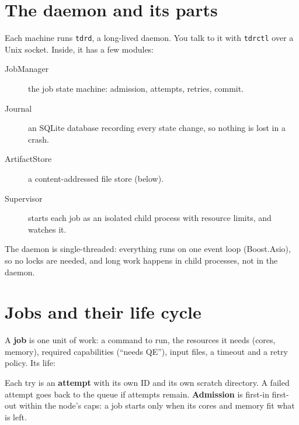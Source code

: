 \documentclass[11pt,a4paper]{report}
\newcommand{\code}[1]{\texttt{#1}}
\begin{document}
\section{The daemon and its parts}

Each machine runs \code{tdrd}, a long-lived daemon. You talk to it with \code{tdrctl} over a
Unix socket. Inside, it has a few modules:

\begin{description}
\item[JobManager] the job state machine: admission, attempts, retries, commit.
\item[Journal] an SQLite database recording every state change, so nothing is lost in a crash.
\item[ArtifactStore] a content-addressed file store (below).
\item[Supervisor] starts each job as an isolated child process with resource limits, and watches it.
\end{description}

The daemon is single-threaded: everything runs on one event loop (Boost.Asio), so no locks
are needed, and long work happens in child processes, not in the daemon.

\section{Jobs and their life cycle}

A \textbf{job} is one unit of work: a command to run, the resources it needs (cores, memory),
required capabilities (``needs QE''), input files, a timeout and a retry policy. Its life:

\begin{center}
\end{center}

Each try is an \textbf{attempt} with its own ID and its own scratch directory. A failed
attempt goes back to the queue if attempts remain. \textbf{Admission} is first-in first-out
within the node's caps: a job starts only when its cores and memory fit what is left.
\end{document}
